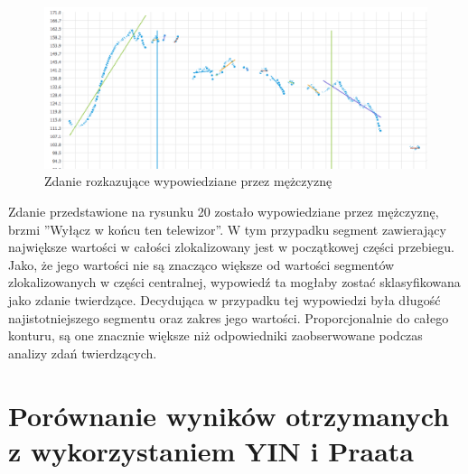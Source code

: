 \documentclass[a4paper,12 pt]{article}
\begin{document}
 \FloatBarrier
\begin{figure}[h]
\centering
\includegraphics[scale=0.7]{rozkaz_mezczyzna_telewizor.png}
\caption{Zdanie rozkazujące wypowiedziane przez mężczyznę}
\end{figure}
\FloatBarrier
Zdanie przedstawione na rysunku 20 zostało wypowiedziane przez mężczyznę, brzmi ''Wyłącz w końcu ten telewizor''.
W tym przypadku segment zawierający największe wartości w całości zlokalizowany jest w początkowej części przebiegu. Jako, że jego wartości nie są znacząco większe od wartości segmentów zlokalizowanych w części centralnej, wypowiedź ta mogłaby zostać sklasyfikowana jako zdanie twierdzące. Decydująca w przypadku tej wypowiedzi była długość najistotniejszego segmentu oraz zakres jego wartości. Proporcjonalnie do całego konturu, są one znacznie większe niż odpowiedniki zaobserwowane podczas analizy zdań twierdzących.
 
\section{Porównanie wyników otrzymanych z wykorzystaniem YIN i Praata}
\newpage
\end{document}
